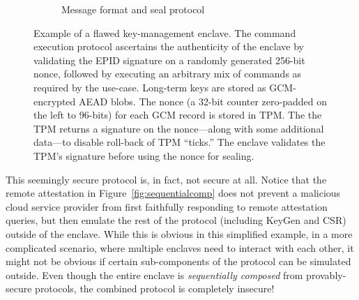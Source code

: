 \documentclass[letterpaper]{article}
\begin{document}
\begin{figure}[h]
\begin{subfigure}[b]{.5\textwidth}
    \caption{Message format and seal protocol}
    \label{fig:sealprotocol}
  \end{subfigure}
  \caption{Example of a flawed key-management enclave. The command
    execution protocol ascertains the authenticity of the enclave by
    validating the EPID signature on a randomly generated 256-bit
    nonce, followed by executing an arbitrary mix of commands as
    required by the use-case. Long-term keys are stored as
    GCM-encrypted AEAD blobs. The nonce (a 32-bit counter zero-padded
    on the left to 96-bits) for each GCM record is stored in TPM. The
    the TPM returns a signature on the nonce---along with some
    additional data---to disable roll-back of TPM ``ticks.'' The
    enclave validates the TPM's signature before using the nonce for
    sealing.}
  \label{fig:usecase}
  \end{figure}

  This seemingly secure protocol is, in fact, not secure at
  all. Notice that the remote attestation in
  Figure~\ref{fig:sequentialcomp} does not prevent a malicious cloud
  service provider from first faithfully responding to remote
  attestation queries, but then emulate the rest of the protocol
  (including \textsf{KeyGen} and CSR) outside of the enclave. While
  this is obvious in this simplified example, in a more complicated
  scenario, where multiple enclaves need to interact with each other,
  it might not be obvious if certain sub-components of the protocol
  can be simulated outside. Even though the entire enclave is
  \textit{sequentially composed} from provably-secure protocols, the
  combined protocol is completely insecure!
\end{document}

